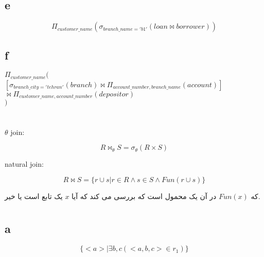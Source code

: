 \documentclass[a4paper]{article}
\makeatletter
\newcommand{\emailone}{\texttt{abbas.yazdanmehr1@gmail.com}}
\newcommand{\myinf}{
	\author{\noindent
عباس یزدان مهر
\\
99243077\\
 مهندسی کامپیوتر, دانشگاه شهید بهشتی
\\
\emailone
	}
}
\makeatother
\begin{document}
\subsection*{e}

\begin{displaymath}
  \Pi_{customer\_name} (\sigma_{branch\_name = 'b1'} (loan \bowtie borrower))
\end{displaymath}

\subsection*{f}

\begin{latin}
  $\Pi_{customer\_name} ( $\\
  \indent \indent $ [\sigma_{branch\_city = 'tehran'} (branch) \bowtie \Pi_{account\_number, branch\_name}(account)] $ \\
  \indent \indent \indent \indent $ \bowtie \Pi_{customer\_name, account\_number}(depositor) $ \\
  $)$
  
\end{latin}

\newpage
\myinf
\section{}
\begin{latin} $\theta$ join: \end{latin}
\begin{displaymath}
  R \bowtie_\theta S = \sigma_\theta (R \times S)
\end{displaymath}


\begin{latin}\noindent natural join: \end{latin}
\begin{displaymath}
  R \bowtie S = \{r \cup s | r \in R \land s \in S \land Fun(r \cup s)\}
\end{displaymath}

که $Fun(x)$ در آن یک محمول است که بررسی می کند که آیا
$x$ یک تابع است یا خیر.

\newpage
\myinf
\section{}
\subsection*{a}
\begin{displaymath}
  \{<a>|\exists b, c (<a,b,c> \in r_1)\}
\end{displaymath}
\end{document}
